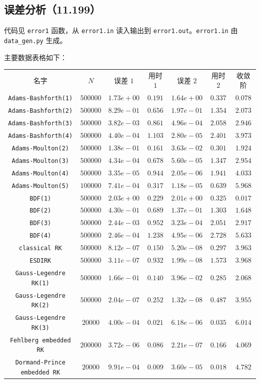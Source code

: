 \documentclass[12pt]{ctexart}
\begin{document}
\subsection*{误差分析（11.199）}

代码见 \texttt{error1} 函数，从 \texttt{error1.in} 读入输出到 \texttt{error1.out}。\texttt{error1.in} 由 \texttt{data\_gen.py} 生成。

主要数据表格如下：

\begin{tabular}{c|c|c|c|c|c|c}
名字&$N$&误差 $1$&用时 $1$&误差 $2$&用时 $2$&收敛阶\\
\texttt{Adams-Bashforth(1)}&$500000$&$1.73e+00$&$0.191$&$1.64e+00$&$0.337$&$0.078$\\
\texttt{Adams-Bashforth(2)}&$500000$&$8.29e-01$&$0.656$&$1.97e-01$&$1.354$&$2.073$\\
\texttt{Adams-Bashforth(3)}&$500000$&$3.82e-03$&$0.861$&$4.96e-04$&$2.058$&$2.946$\\
\texttt{Adams-Bashforth(4)}&$500000$&$4.40e-04$&$1.103$&$2.80e-05$&$2.401$&$3.973$\\
\texttt{Adams-Moulton(2)}&$500000$&$1.38e-01$&$0.161$&$3.63e-02$&$0.301$&$1.924$\\
\texttt{Adams-Moulton(3)}&$500000$&$4.34e-04$&$0.678$&$5.60e-05$&$1.347$&$2.954$\\
\texttt{Adams-Moulton(4)}&$500000$&$3.35e-05$&$0.944$&$2.05e-06$&$1.941$&$4.033$\\
\texttt{Adams-Moulton(5)}&$100000$&$7.41e-04$&$0.317$&$1.18e-05$&$0.639$&$5.968$\\
\texttt{BDF(1)}&$500000$&$2.03e+00$&$0.229$&$2.01e+00$&$0.325$&$0.017$\\
\texttt{BDF(2)}&$500000$&$4.30e-01$&$0.689$&$1.37e-01$&$1.303$&$1.648$\\
\texttt{BDF(3)}&$500000$&$2.44e-03$&$0.952$&$3.23e-04$&$2.051$&$2.917$\\
\texttt{BDF(4)}&$500000$&$2.46e-04$&$1.238$&$4.95e-06$&$2.728$&$5.633$\\
\texttt{classical RK}&$500000$&$8.12e-07$&$0.150$&$5.20e-08$&$0.297$&$3.963$\\
\texttt{ESDIRK}&$500000$&$3.11e-07$&$0.932$&$1.99e-08$&$1.573$&$3.968$\\
\texttt{Gauss-Legendre RK(1)}&$500000$&$1.66e-01$&$0.140$&$3.96e-02$&$0.285$&$2.068$\\
\texttt{Gauss-Legendre RK(2)}&$500000$&$2.04e-07$&$0.252$&$1.32e-08$&$0.487$&$3.955$\\
\texttt{Gauss-Legendre RK(3)}&$20000$&$4.00e-04$&$0.021$&$6.18e-06$&$0.035$&$6.014$\\
\texttt{Fehlberg embedded RK}&$200000$&$3.72e-06$&$0.086$&$2.21e-07$&$0.166$&$4.069$\\
\texttt{Dormand-Prince embedded RK}&$20000$&$9.91e-04$&$0.009$&$3.60e-05$&$0.018$&$4.782$\\
\end{tabular}
\end{document}
